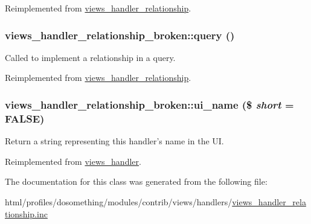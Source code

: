 Reimplemented from \hyperlink{classviews__handler__relationship_a08cc3f5947964d936b5e88d198f82c30}{views\_\-handler\_\-relationship}.\hypertarget{classviews__handler__relationship__broken_a58db24781460cd5b36c08c56df9d56ab}{
\subsubsection[{query}]{\setlength{\rightskip}{0pt plus 5cm}views\_\-handler\_\-relationship\_\-broken::query ()}}
\label{classviews__handler__relationship__broken_a58db24781460cd5b36c08c56df9d56ab}
Called to implement a relationship in a query. 

Reimplemented from \hyperlink{classviews__handler__relationship_a7dc0b6371807dbf06efa594cb52b3348}{views\_\-handler\_\-relationship}.\hypertarget{classviews__handler__relationship__broken_ad6a2ac8a5183f5293745ce27b55ac390}{
\subsubsection[{ui\_\-name}]{\setlength{\rightskip}{0pt plus 5cm}views\_\-handler\_\-relationship\_\-broken::ui\_\-name (\$ {\em short} = {\ttfamily FALSE})}}
\label{classviews__handler__relationship__broken_ad6a2ac8a5183f5293745ce27b55ac390}
Return a string representing this handler's name in the UI. 

Reimplemented from \hyperlink{classviews__handler_ae81019ed08d9c3f5bca3d16c69e7b39f}{views\_\-handler}.

The documentation for this class was generated from the following file:\begin{DoxyCompactItemize}
\item 
html/profiles/dosomething/modules/contrib/views/handlers/\hyperlink{views__handler__relationship_8inc}{views\_\-handler\_\-relationship.inc}\end{DoxyCompactItemize}
